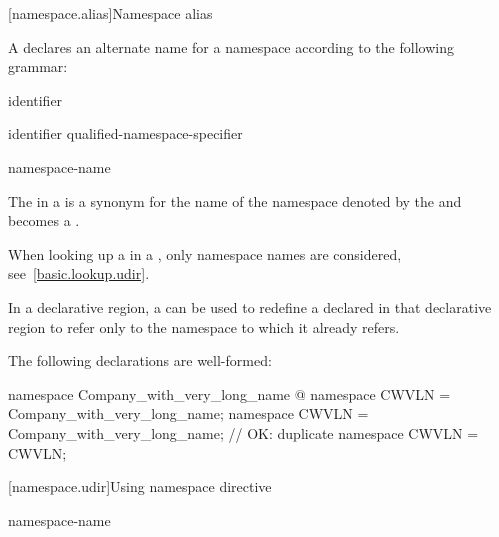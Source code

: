 [namespace.alias]{Namespace alias}%
%
%

\pnum
A  declares an alternate name for a
namespace according to the following grammar:

\begin{bnf}
\br
        identifier
\end{bnf}

\begin{bnf}
\br
         identifier \terminal{=} qualified-namespace-specifier \terminal{;}
\end{bnf}

\begin{bnf}
\br
     namespace-name
\end{bnf}

\pnum
The  in a  is
a synonym for the name of the namespace denoted by the
 and becomes a
.
\begin{note}
When looking up a  in a
, only namespace names are
considered, see~\ref{basic.lookup.udir}.
\end{note}

\pnum
In a declarative region, a  can be
used to redefine a  declared in that
declarative region to refer only to the namespace to which it already
refers.
\begin{example}
The following declarations are well-formed:

\begin{codeblock}
namespace Company_with_very_long_name { @\commentellip@ }
namespace CWVLN = Company_with_very_long_name;
namespace CWVLN = Company_with_very_long_name;  // OK: duplicate
namespace CWVLN = CWVLN;
\end{codeblock}
\end{example}

[namespace.udir]{Using namespace directive}%

\begin{bnf}
\br
        namespace-name \terminal{;}
\end{bnf}

